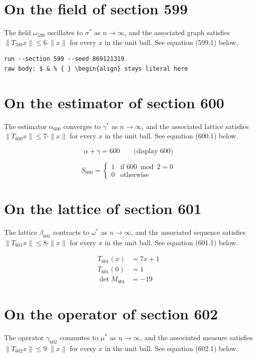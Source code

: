 \documentclass{article}
\begin{document}
\section{On the field of section 599}
The field $\omega_{599}$ oscillates to $\sigma^{*}$ as $n \to \infty$,
and the associated graph satisfies $\|T_{599} x\| \leq 6 \cdot \|x\|$
for every $x$ in the unit ball. See equation (599.1) below.

\begin{verbatim}
run --section 599 --seed 869121319
raw body: $ & % { } \begin{align} stays literal here
\end{verbatim}

\section{On the estimator of section 600}
The estimator $\alpha_{600}$ converges to $\gamma^{*}$ as $n \to \infty$,
and the associated lattice satisfies $\|T_{600} x\| \leq 7 \cdot \|x\|$
for every $x$ in the unit ball. See equation (600.1) below.

$$
\alpha + \gamma = 600 \qquad \text{(display 600)}
$$

\begin{equation}
S_{600} = \begin{cases} 1 & \text{if } 600 \bmod 2 = 0 \\ 0 & \text{otherwise} \end{cases}
\end{equation}

\section{On the lattice of section 601}
The lattice $\beta_{601}$ contracts to $\omega^{*}$ as $n \to \infty$,
and the associated sequence satisfies $\|T_{601} x\| \leq 8 \cdot \|x\|$
for every $x$ in the unit ball. See equation (601.1) below.

\begin{align}
T_{601}(x) &= 7 x + 1 \\
T_{601}(0) &= 1 \\
\det M_{601} &= -19
\end{align}

\section{On the operator of section 602}
The operator $\gamma_{602}$ commutes to $\mu^{*}$ as $n \to \infty$,
and the associated measure satisfies $\|T_{602} x\| \leq 9 \cdot \|x\|$
for every $x$ in the unit ball. See equation (602.1) below.
\end{document}
